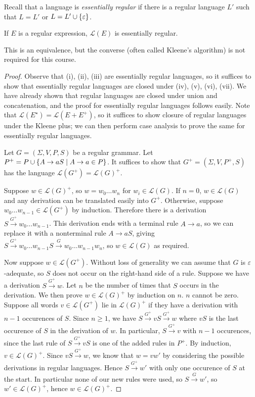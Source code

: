 Recall that a language is \emph{essentially regular} if there is a regular language \( L' \) such that \( L = L' \) or \( L = L' \cup \qty{\varepsilon} \).
\begin{theorem}
	If \( E \) is a regular expression, \( \mathcal L(E) \) is essentially regular.
\end{theorem}
This is an equivalence, but the converse (often called Kleene's algorithm) is not required for this course.
\begin{proof}
	Observe that (i), (ii), (iii) are essentially regular languages, so it suffices to show that essentially regular languages are closed under (iv), (v), (vi), (vii).
	We have already shown that regular languages are closed under union and concatenation, and the proof for essentially regular languages follows easily.
	Note that \( \mathcal L(E^\star) = \mathcal L(E + E^+) \), so it suffices to show closure of regular languages under the Kleene plus; we can then perform case analysis to prove the same for essentially regular languages.

	Let \( G = (\Sigma, V, P, S) \) be a regular grammar.
	Let \( P^+ = P \cup \qty{A \to aS \mid A \to a \in P} \).
	It suffices to show that \( G^+ = (\Sigma, V, P^+, S) \) has the language \( \mathcal L(G^+) = \mathcal L(G)^+ \).

	Suppose \( w \in \mathcal L(G)^+ \), so \( w = w_0 \dots w_n \) for \( w_i \in \mathcal L(G) \).
	If \( n = 0 \), \( w \in \mathcal L(G) \) and any derivation can be translated easily into \( G^+ \).
	Otherwise, suppose \( w_0 \dots w_{n-1} \in \mathcal L(G^+) \) by induction.
	Therefore there is a derivation \( S \xrightarrow{G^+} w_0 \dots w_{n-1} \).
	This derivation ends with a terminal rule \( A \to a \), so we can replace it with a nonterminal rule \( A \to aS \), giving \( S \xrightarrow{G^+} w_0 \dots w_{n-1} S \xrightarrow{G} w_0 \dots w_{n-1} w_n \), so \( w \in \mathcal L(G) \) as required.

	Now suppose \( w \in \mathcal L(G^+) \).
	Without loss of generality we can assume that \( G \) is \( \varepsilon \)-adequate, so \( S \) does not occur on the right-hand side of a rule.
	Suppose we have a derivation \( S \xrightarrow{G^+} w \).
	Let \( n \) be the number of times that \( S \) occurs in the derivation.
	We then prove \( w \in \mathcal L(G)^+ \) by induction on \( n \).
	\( n \) cannot be zero.
	Suppose all words \( v \in \mathcal L(G^+) \) lie in \( \mathcal L(G)^+ \) if they have a derivation with \( n-1 \) occurences of \( S \).
	Since \( n \geq 1 \), we have \( S \xrightarrow{G^+} vS \xrightarrow{G^+} w \) where \( vS \) is the last occurence of \( S \) in the derivation of \( w \).
	In particular, \( S \xrightarrow{G^+} v \) with \( n - 1 \) occurences, since the last rule of \( S \xrightarrow{G^+} vS \) is one of the added rules in \( P^+ \).
	By induction, \( v \in \mathcal L(G)^+ \).
	Since \( vS \xrightarrow{G^+} w \), we know that \( w = vw' \) by considering the possible derivations in regular languages.
	Hence \( S \xrightarrow{G^+} w' \) with only one occurence of \( S \) at the start.
	In particular none of our new rules were used, so \( S \xrightarrow G w' \), so \( w' \in \mathcal L(G)^+ \), hence \( w \in \mathcal L(G)^+ \).
\end{proof}
